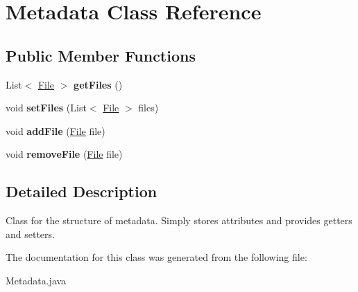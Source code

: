 \hypertarget{class_metadata}{}\section{Metadata Class Reference}
\label{class_metadata}
\subsection*{Public Member Functions}
\begin{DoxyCompactItemize}
\item 
\mbox{\label{class_metadata_adcd700d197a8aa9934d48721bdf271e6}} 
List$<$ \hyperlink{class_file}{File} $>$ {\bfseries get\+Files} ()
\item 
\mbox{\label{class_metadata_a838f80b5ce2c553b8b59b06103941ddd}} 
void {\bfseries set\+Files} (List$<$ \hyperlink{class_file}{File} $>$ files)
\item 
\mbox{\label{class_metadata_aeede28823c9f955e965e7efa0560c1ae}} 
void {\bfseries add\+File} (\hyperlink{class_file}{File} file)
\item 
\mbox{\label{class_metadata_a083a9de06195c4015021b794be560b37}} 
void {\bfseries remove\+File} (\hyperlink{class_file}{File} file)
\end{DoxyCompactItemize}


\subsection{Detailed Description}
Class for the structure of metadata. Simply stores attributes and provides getters and setters. 

The documentation for this class was generated from the following file\+:\begin{DoxyCompactItemize}
\item 
Metadata.\+java\end{DoxyCompactItemize}
